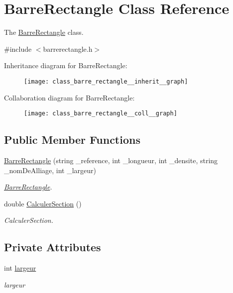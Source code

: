 \hypertarget{class_barre_rectangle}{}\section{Barre\+Rectangle Class Reference}
\label{class_barre_rectangle}


The \hyperlink{class_barre_rectangle}{Barre\+Rectangle} class.  




{\ttfamily \#include $<$barrerectangle.\+h$>$}



Inheritance diagram for Barre\+Rectangle\+:
\nopagebreak
\begin{figure}[H]
\begin{center}
\leavevmode
\texttt{[image: class\_barre\_rectangle\_\_inherit\_\_graph]}
\end{center}
\end{figure}


Collaboration diagram for Barre\+Rectangle\+:
\nopagebreak
\begin{figure}[H]
\begin{center}
\leavevmode
\texttt{[image: class\_barre\_rectangle\_\_coll\_\_graph]}
\end{center}
\end{figure}
\subsection*{Public Member Functions}
\begin{DoxyCompactItemize}
\item 
\hyperlink{class_barre_rectangle_a1bf58e9d7c5aa2ec022b1f522752555c}{Barre\+Rectangle} (string \+\_\+reference, int \+\_\+longueur, int \+\_\+densite, string \+\_\+nom\+De\+Alliage, int \+\_\+largeur)
\begin{DoxyCompactList}\small\item\em \hyperlink{class_barre_rectangle}{Barre\+Rectangle}. \end{DoxyCompactList}\item 
double \hyperlink{class_barre_rectangle_ad6a09075de8d270ea984f0c8fdc462c9}{Calculer\+Section} ()
\begin{DoxyCompactList}\small\item\em Calculer\+Section. \end{DoxyCompactList}\end{DoxyCompactItemize}
\subsection*{Private Attributes}
\begin{DoxyCompactItemize}
\item 
int \hyperlink{class_barre_rectangle_a6805bad77d9cbdf787a911e0841d6d35}{largeur}
\begin{DoxyCompactList}\small\item\em largeur \end{DoxyCompactList}\end{DoxyCompactItemize}
